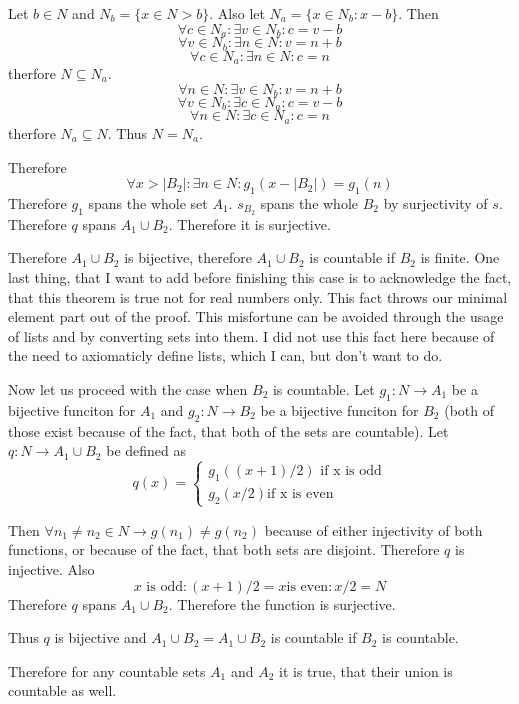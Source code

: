\documentclass[11pt,oneside,titlepage]{book}
\begin{document}
Let $b \in N$ and  $N_b = \{x \in N > b\}$. Also let  $N_a = \{x \in N_b: x -
b\}$. Then
$$\forall c \in N_a: \exists v \in N_b: c = v - b$$
$$\forall v \in N_b: \exists n \in N: v = n + b$$
$$\forall c \in N_a: \exists n \in N: c = n$$
therfore $N \subseteq N_a$.
$$\forall n \in N: \exists v \in N_b: v = n + b$$
$$\forall v \in N_b: \exists c \in N_a: c = v - b$$
$$\forall n \in N: \exists c \in N_a: c = n$$
therfore $N_a \subseteq N$. Thus $N = N_a$.

Therefore
$$\forall x > |B_2|: \exists n \in N: g_1(x - |B_2|) = g_1(n)$$
Therefore $g_1$ spans the whole set $A_1$. $s_{B_2}$ spans the whole $B_2$ by
surjectivity of $s$. Therefore $q$ spans $A_1 \cup B_2$. Therefore it
is surjective.

Therefore $A_1 \cup B_2$ is bijective, therefore $A_1 \cup B_2$ is countable
if $B_2$ is finite. One last thing, that I want to add before finishing this case
is to acknowledge the fact, that this theorem is  true not for
real numbers only. This fact throws our minimal element part out of  the proof.
This misfortune can be avoided through the usage of lists and by converting sets
into them. I did not use this fact here because of the need to axiomaticly
define lists, which I can, but don't want to do. 

Now let us proceed with the case when $B_2$ is countable. Let $g_1: N \to A_1$ be a bijective funciton for $A_1$ and $g_2: N \to B_2$ be a bijective funciton
for $B_2$ (both of those exist because of the fact, that both of the sets are
countable).  Let $q: N \to A_1 \cup B_2$ be defined as
\begin{equation}
  q(x) =
  \begin{cases}
    g_1((x + 1) /  2) \text{ if x is odd} \\
    g_2(x / 2) \text{if x is even}
  \end{cases}
\end{equation}

Then $\forall n_1 \neq n_2 \in N \to g(n_1) \neq g(n_2)$ because of either
injectivity of both functions, or because of the fact, that both sets are
disjoint. Therefore $q$ is injective. Also
$${x \text{ is odd}: (x + 1) / 2} = {x \text{is even}: x/2 } = N$$
Therefore $q$ spans $A_1 \cup B_2$. Therefore the function is surjective.

Thus $q$ is bijective and $A_1 \cup B_2 = A_1 \cup B_2$ is countable if
$B_2$ is countable.

Therefore for any countable sets $A_1$ and $A_2$ it is true, that their
union is countable as well.
\end{document}
